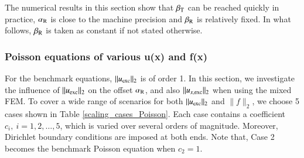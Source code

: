 \documentclass[review,3p]{elsarticle}
\begin{document}

The numerical results in this section show that $\beta_{\rm T}$ can be reached quickly in practice, $\alpha_{\rm R}$ is close to the machine precision and $\beta_{\rm R}$ is relatively fixed. In what follows, $\beta_{\rm R}$ is taken as constant if not stated otherwise.

\subsubsection{Poisson equations of various u(x) and f(x)}	    \label{section_scaling}

For the benchmark equations, $\|u_{\rm exc}\|_2$ is of order 1. In this section, we investigate the influence of $\|u_{\rm exc}\|_2$ on the offset $\alpha_{\rm R}$, and also $\|u_{x,\rm exc}\|_2$ when using the mixed FEM.
To cover a wide range of scenarios for both $\|u_{\rm exc}\|_2$ and $\|f\|_2$, we choose 5 cases shown in Table \ref{scaling_cases_Poisson}. Each case contains a coefficient $c_i,~i=1,2, \ldots , 5$, which is varied over several orders of magnitude.
Moreover, Dirichlet boundary conditions are imposed at both ends.
Note that, Case 2 becomes the benchmark Poisson equation when $c_2=1$.
\end{document}
